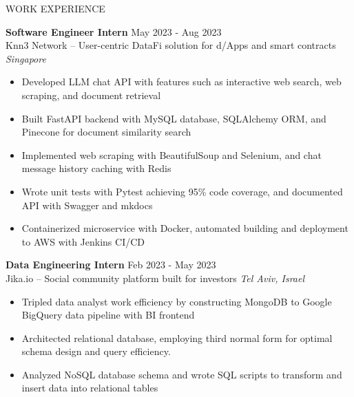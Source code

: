 \documentclass{resume} %
\begin{document}
\begin{rSection}{WORK EXPERIENCE}

	\textbf{Software Engineer Intern} \hfill May 2023 - Aug 2023\\
	Knn3 Network – User-centric DataFi solution for d/Apps and smart contracts  \hfill \textit{Singapore}
	\begin{itemize}
		\item Developed LLM chat API with features such as interactive web search, web scraping, and document retrieval
		\item Built FastAPI backend with MySQL database, SQLAlchemy ORM, and Pinecone for document similarity search
		\item Implemented web scraping with BeautifulSoup and Selenium, and chat message history caching with Redis
		\item Wrote unit tests with Pytest achieving 95\% code coverage, and documented API with Swagger and mkdocs
		\item Containerized microservice with Docker, automated building and deployment to AWS with Jenkins CI/CD
	\end{itemize}

	\textbf{Data Engineering Intern} \hfill Feb 2023 - May 2023\\
	Jika.io – Social community platform built for investors \hfill \textit{Tel Aviv, Israel}
	\begin{itemize}
		\item Tripled data analyst work efficiency by constructing MongoDB to Google BigQuery data pipeline with BI frontend
		\item Architected relational database, employing third normal form for optimal schema design and query efficiency.
		\item Analyzed NoSQL database schema and wrote SQL scripts to transform and insert data into relational tables
	\end{itemize}

\end{rSection}

\end{document}
